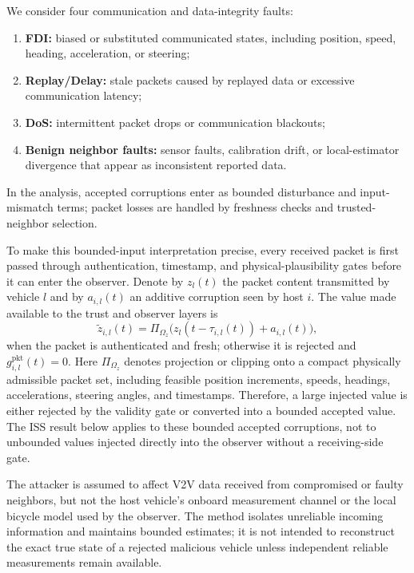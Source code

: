 \documentclass[letterpaper,journal]{IEEEtran}
\begin{document}
We consider four communication and data-integrity faults:
\begin{enumerate}
    \item[(1)] \textbf{FDI:} biased or substituted communicated states, including position, speed, heading, acceleration, or steering;
    \item[(2)] \textbf{Replay/Delay:} stale packets caused by replayed data or excessive communication latency;
    \item[(3)] \textbf{DoS:} intermittent packet drops or communication blackouts;
    \item[(4)] \textbf{Benign neighbor faults:} sensor faults, calibration drift, or local-estimator divergence that appear as inconsistent reported data.
\end{enumerate}
In the analysis, accepted corruptions enter as bounded disturbance and input-mismatch terms; packet losses are handled by freshness checks and trusted-neighbor selection.

To make this bounded-input interpretation precise, every received packet is first passed through authentication, timestamp, and physical-plausibility gates before it can enter the observer. Denote by $z_l(t)$ the packet content transmitted by vehicle $l$ and by $a_{i,l}(t)$ an additive corruption seen by host $i$. The value made available to the trust and observer layers is
\begin{equation}
    \tilde z_{i,l}(t)
    =
    \Pi_{\Omega_z}\big(z_l(t-\tau_{i,l}(t))+a_{i,l}(t)\big),
    \label{eq_received_packet_gate}
\end{equation}
when the packet is authenticated and fresh; otherwise it is rejected and $g_{i,l}^{\mathrm{pkt}}(t)=0$. Here $\Pi_{\Omega_z}$ denotes projection or clipping onto a compact physically admissible packet set, including feasible position increments, speeds, headings, accelerations, steering angles, and timestamps. Therefore, a large injected value is either rejected by the validity gate or converted into a bounded accepted value. The ISS result below applies to these bounded accepted corruptions, not to unbounded values injected directly into the observer without a receiving-side gate.

The attacker is assumed to affect V2V data received from compromised or faulty neighbors, but not the host vehicle's onboard measurement channel or the local bicycle model used by the observer. The method isolates unreliable incoming information and maintains bounded estimates; it is not intended to reconstruct the exact true state of a rejected malicious vehicle unless independent reliable measurements remain available.
\end{document}
